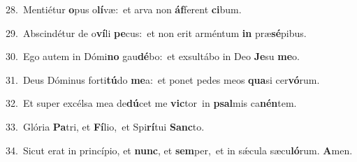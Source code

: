 {\numbfont\textcolor{\numbcolor}{28.}}~Mentiétur \textbf{o}\-pus o\-\textbf{lí}\-væ:~\star et arva non \textbf{áf}\-ferent \textbf{ci}\-bum.\par
{\numbfont\textcolor{\numbcolor}{29.}}~Abscindétur de o\-\textbf{ví}\-li \textbf{pe}\-cus:~\star et non erit arméntum \textbf{in} præ\-\textbf{sé}\-pibus.\par
{\numbfont\textcolor{\numbcolor}{30.}}~Ego autem in Dómi\textbf{no} gau\-\textbf{dé}\-bo:~\star et exsultábo in Deo \textbf{Je}\-su \textbf{me}\-o.\par
{\numbfont\textcolor{\numbcolor}{31.}}~Deus Dóminus forti\-\textbf{tú}\-do \textbf{me}\-a:~\star et ponet pedes meos \textbf{qua}\-si cer\-\textbf{vó}\-rum.\par
{\numbfont\textcolor{\numbcolor}{32.}}~Et super excélsa mea de\-\textbf{dú}\-cet me \textbf{vic}\-tor~\star in \textbf{psal}\-mis ca\-\textbf{nén}\-tem.\par
{\numbfont\textcolor{\numbcolor}{33.}}~Glória \textbf{Pa}\-tri, et \textbf{Fí}\-lio,~\star et Spi\-\textbf{rí}\-tui \textbf{Sanc}\-to.\par
{\numbfont\textcolor{\numbcolor}{34.}}~Sicut erat in princípio, et \textbf{nunc}\-, et \textbf{sem}\-per,~\star et in sǽcula sæcu\-\textbf{ló}\-rum. \textbf{A}\-men.\par
